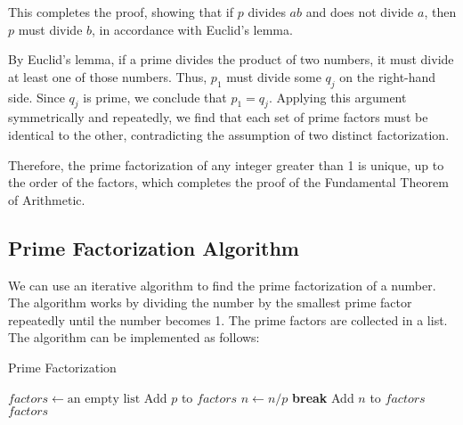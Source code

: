 \documentclass[oneside]{book}
\begin{document}
{{	This completes the proof, showing that if \(p\) divides \(ab\) and does not divide \(a\), then \(p\) must divide \(b\), in accordance with Euclid's lemma.}

By Euclid's lemma, if a prime divides the product of two numbers, it must divide at least one of those numbers. Thus, $p_1$ must divide some $q_j$ on the right-hand side. Since $q_j$ is prime, we conclude that $p_1 = q_j$. Applying this argument symmetrically and repeatedly, we find that each set of prime factors must be identical to the other, contradicting the assumption of two distinct factorization.

Therefore, the prime factorization of any integer greater than 1 is unique, up to the order of the factors, which completes the proof of the Fundamental Theorem of Arithmetic.
}


\subsection{Prime Factorization Algorithm}
We can use an iterative algorithm to find the prime factorization of a number. The algorithm works by dividing the number by the smallest prime factor repeatedly until the number becomes 1. The prime factors are collected in a list.
The algorithm can be implemented as follows:
\begin{algorithm}
	\caption{Prime Factorization}
	\begin{algorithmic}[H]
		\State $factors \gets \text{an empty list}$
		 
		\State Add $p$ to $factors$
		\State $n \gets n / p$
		\EndWhile
		\State \textbf{break}
		\EndIf
		\EndFor
		\State Add $n$ to $factors$
		\EndIf
		\State \Return $factors$
		\EndFunction
	\end{algorithmic}
\end{algorithm}
\end{document}
